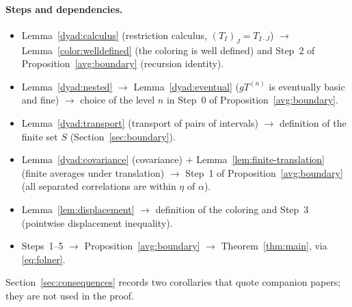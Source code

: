 \documentclass[11pt]{article}
\theoremstyle{definition}
\numberwithin{equation}{section}
\begin{document}
\paragraph{Steps and dependencies.}
\begin{itemize}
\item Lemma~\ref{dyad:calculus} (restriction calculus,
\((T_I)_J=T_{I\cdot J}\)) \(\to\) Lemma~\ref{color:welldefined}
(the coloring is well defined) and Step~2 of
Proposition~\ref{avg:boundary} (recursion identity).
\item Lemma~\ref{dyad:nested} \(\to\) Lemma~\ref{dyad:eventual}
(\(gT^{(n)}\) is eventually basic and fine) \(\to\) choice of the level
\(n\) in Step~0 of Proposition~\ref{avg:boundary}.
\item Lemma~\ref{dyad:transport} (transport of pairs of intervals)
\(\to\) definition of the finite set \(S\) (Section~\ref{sec:boundary}).
\item Lemma~\ref{dyad:covariance} (covariance) \(+\)
Lemma~\ref{lem:finite-translation} (finite averages under translation)
\(\to\) Step~1 of Proposition~\ref{avg:boundary} (all separated
correlations are within \(\eta\) of \(\alpha\)).
\item Lemma~\ref{lem:displacement} \(\to\) definition of the coloring and
Step~3 (pointwise displacement inequality).
\item Steps~1--5 \(\to\) Proposition~\ref{avg:boundary} \(\to\)
Theorem~\ref{thm:main}, via \eqref{eq:folner}.
\end{itemize}
Section~\ref{sec:consequences} records two corollaries that quote
companion papers; they are not used in the proof.
\end{document}
